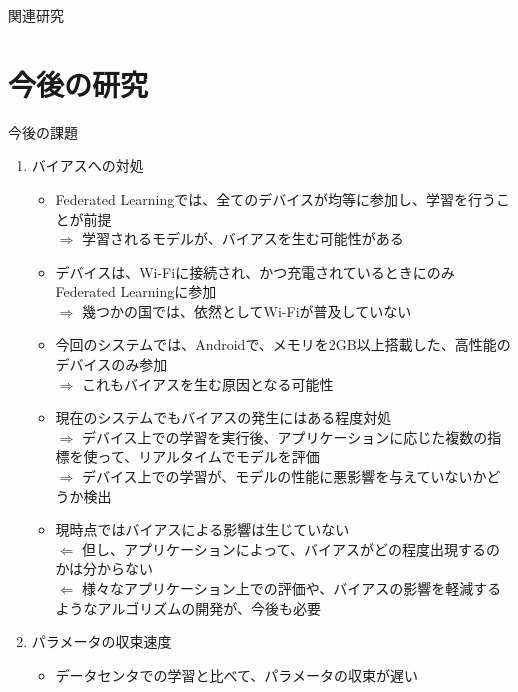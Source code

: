 \documentclass[dvipdfmx,notheorems,t]{beamer}
\begin{document}
\begin{frame}{関連研究}
\end{frame}

\section{今後の研究}

\begin{frame}{今後の課題}

\begin{enumerate}
	\item バイアスへの対処
	\begin{itemize}
		\item Federated Learningでは、全てのデバイスが均等に参加し、学習を行うことが前提 \\
		$\Rightarrow$ 学習されるモデルが、バイアスを生む可能性がある
		\newline
		
		\item デバイスは、Wi-Fiに接続され、かつ充電されているときにのみFederated Learningに参加 \\
		$\Rightarrow$ 幾つかの国では、依然としてWi-Fiが普及していない
		\newline
		
		\item 今回のシステムでは、Androidで、メモリを2GB以上搭載した、高性能のデバイスのみ参加 \\
		$\Rightarrow$ これもバイアスを生む原因となる可能性
		\newline
		
		\item 現在のシステムでもバイアスの発生にはある程度対処 \\
		$\Rightarrow$ デバイス上での学習を実行後、アプリケーションに応じた複数の指標を使って、リアルタイムでモデルを評価 \\
		$\Rightarrow$ デバイス上での学習が、モデルの性能に悪影響を与えていないかどうか検出
		\newline
		
		\item 現時点ではバイアスによる影響は生じていない \\
		$\Leftarrow$ 但し、アプリケーションによって、バイアスがどの程度出現するのかは分からない \\
		$\Leftarrow$ 様々なアプリケーション上での評価や、バイアスの影響を軽減するようなアルゴリズムの開発が、今後も必要
	\end{itemize}
	
	\framebreak
	
	\item パラメータの収束速度
	\begin{itemize}
		\item データセンタでの学習と比べて、パラメータの収束が遅い
		\newline
		

\end{itemize}
\end{enumerate}
\end{frame}
\end{document}
